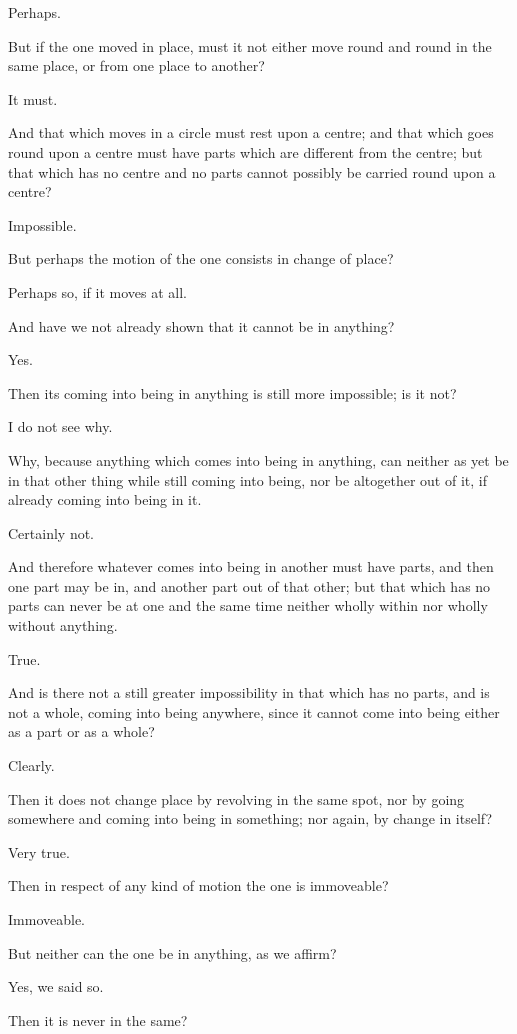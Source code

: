 Perhaps.

But if the one moved in place, must it not either move round and round
in the same place, or from one place to another?

It must.

And that which moves in a circle must rest upon a centre; and that which
goes round upon a centre must have parts which are different from the
centre; but that which has no centre and no parts cannot possibly be
carried round upon a centre?

Impossible.

But perhaps the motion of the one consists in change of place?

Perhaps so, if it moves at all.

And have we not already shown that it cannot be in anything?

Yes.

Then its coming into being in anything is still more impossible; is it
not?

I do not see why.

Why, because anything which comes into being in anything, can neither
as yet be in that other thing while still coming into being, nor be
altogether out of it, if already coming into being in it.

Certainly not.

And therefore whatever comes into being in another must have parts, and
then one part may be in, and another part out of that other; but that
which has no parts can never be at one and the same time neither wholly
within nor wholly without anything.

True.

And is there not a still greater impossibility in that which has no
parts, and is not a whole, coming into being anywhere, since it cannot
come into being either as a part or as a whole?

Clearly.

Then it does not change place by revolving in the same spot, nor by
going somewhere and coming into being in something; nor again, by change
in itself?

Very true.

Then in respect of any kind of motion the one is immoveable?

Immoveable.

But neither can the one be in anything, as we affirm?

Yes, we said so.

Then it is never in the same?

